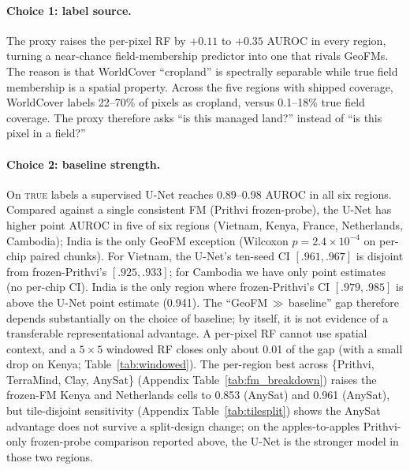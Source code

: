 \documentclass{article}
\begin{document}
\paragraph{Choice 1: label source.} The proxy raises the
per-pixel RF by $+0.11$ to $+0.35$ AUROC in every region, turning a near-chance
field-membership predictor into one that rivals GeoFMs. The reason is that WorldCover
``cropland'' is spectrally separable while true field membership is a spatial
property. Across the five regions with shipped coverage, WorldCover labels 22--70\% of
pixels as cropland, versus 0.1--18\% true field coverage. The proxy therefore asks ``is this managed land?''
instead of ``is this pixel in a field?''

\paragraph{Choice 2: baseline strength.}
On \textsc{true} labels a supervised U-Net reaches 0.89--0.98 AUROC in all six
regions. Compared against a single consistent FM (Prithvi frozen-probe), the U-Net
has higher point AUROC in five of six regions (Vietnam, Kenya, France, Netherlands,
Cambodia); India is the only GeoFM exception (Wilcoxon $p{=}2.4\times10^{-4}$
on per-chip paired chunks). For Vietnam, the U-Net's ten-seed CI $[.961,.967]$
is disjoint from frozen-Prithvi's $[.925,.933]$; for Cambodia we have only point
estimates (no per-chip CI). India is the only region where frozen-Prithvi's CI
$[.979,.985]$ is above the U-Net point estimate (0.941). The
``GeoFM\,$\gg$\,baseline'' gap therefore depends substantially on the choice
of baseline; by itself, it is not evidence of a transferable representational advantage. A per-pixel RF
cannot use spatial context, and a $5\times5$ windowed RF closes only about 0.01 of
the gap (with a small drop on Kenya; Table~\ref{tab:windowed}). The per-region best across \{Prithvi, TerraMind, Clay, AnySat\}
(Appendix Table~\ref{tab:fm_breakdown}) raises the frozen-FM Kenya and Netherlands
cells to 0.853 (AnySat) and 0.961 (AnySat), but tile-disjoint sensitivity
(Appendix Table~\ref{tab:tilesplit}) shows the AnySat advantage does not survive a
split-design change; on the apples-to-apples Prithvi-only frozen-probe comparison
reported above, the U-Net is the stronger model in those two regions.
\end{document}
